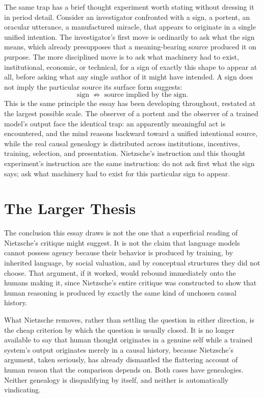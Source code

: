 \documentclass[11pt]{article}
\begin{document}
The same trap has a brief thought experiment worth stating without dressing it in period detail. Consider an investigator confronted with a sign, a portent, an oracular utterance, a manufactured miracle, that appears to originate in a single unified intention. The investigator's first move is ordinarily to ask what the sign means, which already presupposes that a meaning-bearing source produced it on purpose. The more disciplined move is to ask what machinery had to exist, institutional, economic, or technical, for a sign of exactly this shape to appear at all, before asking what any single author of it might have intended. A sign does not imply the particular source its surface form suggests:
\[
\text{sign} \;\not\Rightarrow\; \text{source implied by the sign}.
\]
This is the same principle the essay has been developing throughout, restated at the largest possible scale. The observer of a portent and the observer of a trained model's output face the identical trap: an apparently meaningful act is encountered, and the mind reasons backward toward a unified intentional source, while the real causal genealogy is distributed across institutions, incentives, training, selection, and presentation. Nietzsche's instruction and this thought experiment's instruction are the same instruction: do not ask first what the sign says; ask what machinery had to exist for this particular sign to appear.

\section{The Larger Thesis}

The conclusion this essay draws is not the one that a superficial reading of Nietzsche's critique might suggest. It is not the claim that language models cannot possess agency because their behavior is produced by training, by inherited language, by social valuation, and by conceptual structures they did not choose. That argument, if it worked, would rebound immediately onto the humans making it, since Nietzsche's entire critique was constructed to show that human reasoning is produced by exactly the same kind of unchosen causal history.

What Nietzsche removes, rather than settling the question in either direction, is the cheap criterion by which the question is usually closed. It is no longer available to say that human thought originates in a genuine self while a trained system's output originates merely in a causal history, because Nietzsche's argument, taken seriously, has already dismantled the flattering account of human reason that the comparison depends on. Both cases have genealogies. Neither genealogy is disqualifying by itself, and neither is automatically vindicating.
\end{document}
